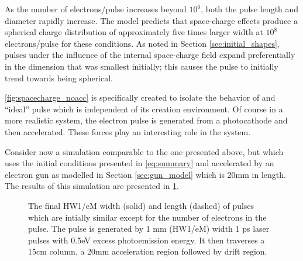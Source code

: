 
As the number of electrons/pulse increases beyond $10^6$, both the pulse length and diameter rapidly increase.
The model predicts that space-charge effects produce a spherical charge distribution of approximately five times larger width at $10^8$ electrons/pulse for these conditions.
As noted in Section \ref{sec:initial_shapes}, pulses under the influence of the internal space-charge field expand preferentially in the dimension that was smallest initially; this causes the pulse to initially trend towards being spherical.

\ref{fig:spacecharge_noacc} is specifically created to isolate the behavior of and ``ideal'' pulse which is independent of its creation environment.
Of course in a more realistic system, the electron pulse is generated from a photocathode and then accelerated.
These forces play an interesting role in the system.

Consider now a simulation comparable to the one presented above, but which uses the initial conditions presented in \ref{eq:summary} and accelerated by an electron gun as modelled in Section \ref{sec:gun_model} which is 20mm in length.
The results of this simulation are presented in \ref{fig:spacecharge_acc}.
\begin{figure}
  \centering
  \begin{tikzpicture}
    
  \end{tikzpicture}
  \caption[More realistic free-space pulse evolution vs charge density]{
    The final HW1/eM width (solid) and length (dashed) of pulses which are intially similar except for the number of electrons in the pulse.
    The pulse is generated by 1 mm (HW1/eM) width 1 ps laser pulses with 0.5eV excess photoemission energy.
    It then traverses a 15cm column, a 20mm acceleration region followed by drift region.
  }
  \label{fig:spacecharge_acc}
\end{figure}

